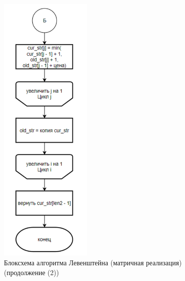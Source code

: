 \begin{figure}[H]
    \centering
    \includegraphics[width=0.4\textwidth]{img/block_1_1_3.png}
    \caption{Блоксхема алгоритма Левенштейна (матричная реализация) (продолжение (2))}
\end{figure}

